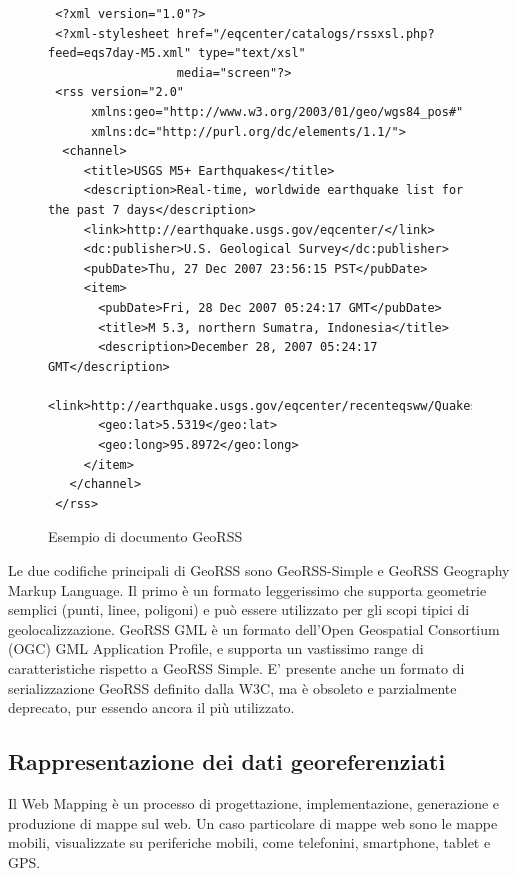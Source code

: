\begin{figure}
\begin{center}
\lstset{language=MYXML}
\begin{lstlisting}
 <?xml version="1.0"?>
 <?xml-stylesheet href="/eqcenter/catalogs/rssxsl.php?feed=eqs7day-M5.xml" type="text/xsl" 
                  media="screen"?>
 <rss version="2.0" 
      xmlns:geo="http://www.w3.org/2003/01/geo/wgs84_pos#" 
      xmlns:dc="http://purl.org/dc/elements/1.1/">
  <channel>
     <title>USGS M5+ Earthquakes</title>
     <description>Real-time, worldwide earthquake list for the past 7 days</description>
     <link>http://earthquake.usgs.gov/eqcenter/</link>
     <dc:publisher>U.S. Geological Survey</dc:publisher>
     <pubDate>Thu, 27 Dec 2007 23:56:15 PST</pubDate>
     <item>
       <pubDate>Fri, 28 Dec 2007 05:24:17 GMT</pubDate>
       <title>M 5.3, northern Sumatra, Indonesia</title>
       <description>December 28, 2007 05:24:17 GMT</description>
       <link>http://earthquake.usgs.gov/eqcenter/recenteqsww/Quakes/us2007llai.php</link>
       <geo:lat>5.5319</geo:lat>
       <geo:long>95.8972</geo:long>
     </item>
   </channel>
 </rss>
\end{lstlisting}
\caption{Esempio di documento GeoRSS\label{georssimage}}
\end{center}
\end{figure}
Le due codifiche principali di GeoRSS sono GeoRSS-Simple e GeoRSS Geography Markup Language. Il primo è un formato leggerissimo che supporta geometrie semplici (punti, linee, poligoni) e può essere utilizzato per gli scopi tipici di geolocalizzazione. GeoRSS GML è un formato dell'Open Geospatial Consortium (OGC) GML Application Profile, e supporta un vastissimo range di caratteristiche rispetto a GeoRSS Simple.
E' presente anche un formato di serializzazione GeoRSS definito dalla W3C, ma è obsoleto e parzialmente deprecato, pur essendo ancora il più utilizzato.

\clearpage{\pagestyle{empty}\cleardoublepage}

\subsection{Rappresentazione dei dati georeferenziati}
Il Web Mapping è un processo di progettazione, implementazione, generazione e produzione di mappe sul web.
Un caso particolare di mappe web sono le mappe mobili, visualizzate su periferiche mobili, come telefonini, smartphone, tablet e GPS.

